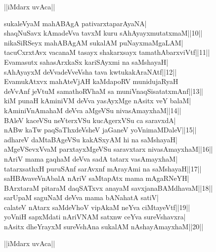 \documentclass{article}
\begin{document}
\begin{center}
||iMdarx uvAca||
\end{center}

sukaleVyaM mahABAgA pativarxtaparAyaNA|\\
shaqNuSavx kAmadeVva tavxM kuru sAhAyayxmutatxmaM||10||\\
nikaSiRSeyx mahABAgAM sukalAM puNayxmaMgaLAM|\\
tacuCxrxtAvx vacanaM tasayx shakarxsayx tamathAbarxviVtf||11||\\
Evamasutx sahasArxkaSx kariSAyxmi na saMshayaH|\\
sAhAyayxM deVvadeVveVsha tava kwtukakAraNAtf||12||\\
EvamukAtxvx mahAteVjAH kaMdapoRV munidujaRyaH\\
deVvAnf jeVtuM samathoRVhaM sa muniVnaqSisatatxmAnf||13||\\
kiM punaH kAminiVM deVva yasAyxMge nAsitx veY balaM|\\
kAminiVnAmahaM deVva aMgeVSu nivasAmayxhaM||14||\\
BAleV kaceVSu neVterxVSu kucAgerxVSu ca saravxdA|\\
nABw kaTw paqSaThxdeVsheV jaGaneV yoVnimaMDaleV||15||\\
adhareV daMtaBAgeVSu kakASxyAM hi na saMshayaH|\\
aMgeVSevxVvaM parxtayxMgeVSu saravxtarx nivasAmayxhaM||16||\\
nAriV mama gaqhaM deVva sadA tatarx vasAmayxhaM|\\
tatarxsathxH puruSAnf sarAvxnf mArayAmi na saMshayaH||17||\\
saHBAvaveVnAbalA nAriV saMtapAtx mama mAgaRNeYH|\\
BArxtaraM pitaraM daqSATxvx anayaM savxjanaBAMdhavaM||18||\\
sarUpaM saguNaM deVva mama bANahatA satiV|\\
calateV nAtarx saMdeVhoV vipAkaM neYva ciMtayeVtf||19||\\
yoVniH sapxMdati nAriVNAM satxnw ceYva sureVshavxra|\\
nAsitx dheYrayxM sureVshAna sukalAM nAshayAmayxhaM||20||\\

\begin{center}
||iMdarx uvAca||
\end{center}
\end{document}
